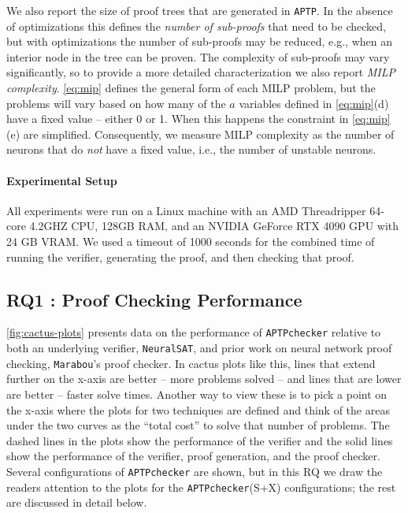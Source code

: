 \documentclass[oneside,11pt,dvipsnames]{book}
\newcommand{\ignore}[1]{}
\newcommand{\nnproofchecker}{\texttt{APTPchecker}}
\newcommand{\nnproofformat}{\texttt{APTP}}
\newcommand{\marabou}{\texttt{Marabou}}
\newcommand{\neuralsat}{\texttt{NeuralSAT}}
\begin{document}
We also report the size of proof trees that are generated in \nnproofformat{}.
In the absence of optimizations this defines the \textit{number of sub-proofs}
that need to be checked, but with optimizations the number of sub-proofs may
be reduced, e.g., when an interior node in the tree can be proven.
The complexity of  sub-proofs
may vary significantly, so to provide a more detailed characterization we
also report \textit{MILP complexity}.  \autoref{eq:mip} defines the general form
of each MILP problem, but the problems will vary based on how many of the $a$ variables
defined in \autoref{eq:mip}(d) have a fixed value -- either 0 or 1.   When this
happens the constraint in \autoref{eq:mip}(e) are simplified.
Consequently, we measure MILP complexity as the number of neurons that do \textit{not}
have a fixed value, i.e., the number of unstable neurons.  
\ignore{This does not account for the contribution of \autoref{eq:mip}a,b which is directly
related to network size and input/output dimension.   Is there any way to measure that?}

\paragraph{Experimental Setup}
All experiments were run on a Linux machine with an AMD Threadripper 64-core 4.2GHZ CPU, 128GB RAM, and an NVIDIA GeForce RTX 4090 GPU with 24 GB VRAM. 
We used a timeout of 1000 seconds for the combined time of running the verifier,
generating the proof, and then checking that proof.

\subsection{RQ1 : Proof Checking Performance}
\label{sec:rq1}
\autoref{fig:cactus-plots} presents data on the performance
of \nnproofchecker{} relative to both an underlying verifier, \neuralsat{}, and prior work on neural network proof checking, \marabou{}'s proof checker.  
In cactus plots like this, lines that extend further on the x-axis
are better -- more problems solved -- and lines that are lower are better -- faster solve times.
Another way to view these is to pick a point on the x-axis where the plots for two techniques are defined and think of the areas under the two curves as the ``total cost'' to solve that number of problems.
The dashed lines in the plots show the performance of the verifier and the solid lines show the performance of the verifier, proof generation, and the proof checker.  Several configurations of
\nnproofchecker{} are shown, but in this RQ we draw the readers attention
to the plots for the \nnproofchecker{}(S+X) configurations; the rest are discussed in detail below.
\end{document}
